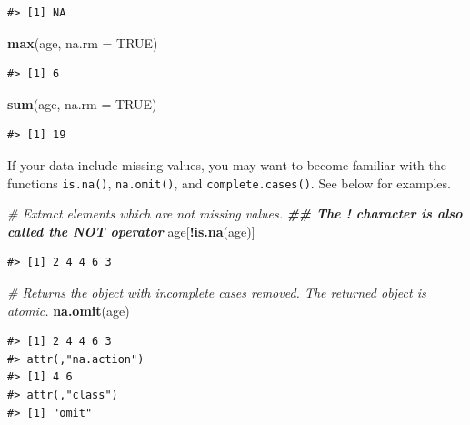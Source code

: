 \documentclass[
]{book}
\newenvironment{Shaded}{\begin{snugshade}}{\end{snugshade}}
\newcommand{\AttributeTok}[1]{\textcolor[rgb]{0.13,0.29,0.53}{#1}}
\newcommand{\CommentTok}[1]{\textcolor[rgb]{0.56,0.35,0.01}{\textit{#1}}}
\newcommand{\ConstantTok}[1]{\textcolor[rgb]{0.56,0.35,0.01}{#1}}
\newcommand{\DocumentationTok}[1]{\textcolor[rgb]{0.56,0.35,0.01}{\textbf{\textit{#1}}}}
\newcommand{\FunctionTok}[1]{\textcolor[rgb]{0.13,0.29,0.53}{\textbf{#1}}}
\newcommand{\NormalTok}[1]{#1}
\newcommand{\SpecialCharTok}[1]{\textcolor[rgb]{0.81,0.36,0.00}{\textbf{#1}}}
\begin{document}
\begin{verbatim}
#> [1] NA
\end{verbatim}

\begin{Shaded}
\begin{Highlighting}[]
\FunctionTok{max}\NormalTok{(age, }\AttributeTok{na.rm =} \ConstantTok{TRUE}\NormalTok{)}
\end{Highlighting}
\end{Shaded}

\begin{verbatim}
#> [1] 6
\end{verbatim}

\begin{Shaded}
\begin{Highlighting}[]
\FunctionTok{sum}\NormalTok{(age, }\AttributeTok{na.rm =} \ConstantTok{TRUE}\NormalTok{)}
\end{Highlighting}
\end{Shaded}

\begin{verbatim}
#> [1] 19
\end{verbatim}

If your data include missing values, you may want to become familiar with the
functions \texttt{is.na()}, \texttt{na.omit()}, and \texttt{complete.cases()}. See below for
examples.

\begin{Shaded}
\begin{Highlighting}[]
\CommentTok{\# Extract elements which are not missing values.}
\DocumentationTok{\#\# The ! character is also called the NOT operator}
\NormalTok{age[}\SpecialCharTok{!}\FunctionTok{is.na}\NormalTok{(age)]}
\end{Highlighting}
\end{Shaded}

\begin{verbatim}
#> [1] 2 4 4 6 3
\end{verbatim}

\begin{Shaded}
\begin{Highlighting}[]
\CommentTok{\# Returns the object with incomplete cases removed. The returned object is atomic.}
\FunctionTok{na.omit}\NormalTok{(age)}
\end{Highlighting}
\end{Shaded}

\begin{verbatim}
#> [1] 2 4 4 6 3
#> attr(,"na.action")
#> [1] 4 6
#> attr(,"class")
#> [1] "omit"
\end{verbatim}
\end{document}
